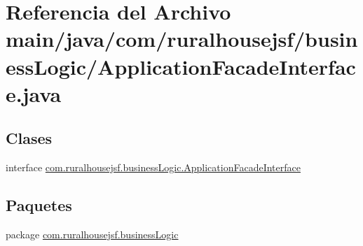 \hypertarget{a00008}{}\section{Referencia del Archivo main/java/com/ruralhousejsf/business\+Logic/\+Application\+Facade\+Interface.java}
\label{a00008}
\subsection*{Clases}
\begin{DoxyCompactItemize}
\item 
interface \mbox{\hyperlink{a00136}{com.\+ruralhousejsf.\+business\+Logic.\+Application\+Facade\+Interface}}
\end{DoxyCompactItemize}
\subsection*{Paquetes}
\begin{DoxyCompactItemize}
\item 
package \mbox{\hyperlink{a00108}{com.\+ruralhousejsf.\+business\+Logic}}
\end{DoxyCompactItemize}
